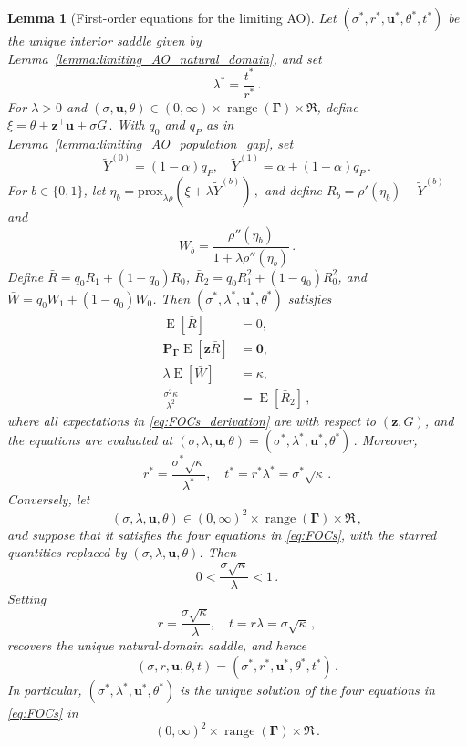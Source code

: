 \documentclass{article}
\DeclareMathOperator{\expect}{E}
\newtheorem{lemma}{Lemma}
\theoremstyle{definition}
\newcommand*{\bb}{\boldsymbol}
\newcommand{\prox}[2]{\ensuremath{\textrm{prox}_{#1}\left(#2\right)}}
\def\bu{\bb{u}}
\def\Ytil{\widetilde{Y}}
\def\bz{\bb{z}}
\newcommand{\range}{\operatorname{range}}
\begin{document}
\begin{bibunit}
\begin{lemma}[First-order equations for the limiting AO]
	\label{lemma:limiting_AO_focs}
	Let $(\sigma^*,r^*,\bu^*,\theta^*,t^*)$
	be the unique interior saddle given by
	Lemma~\ref{lemma:limiting_AO_natural_domain}, and set
	$$
		\lambda^*=\frac{t^*}{r^*}\,.
	$$
	For $\lambda>0$ and
	$(\sigma,\bu,\theta)\in(0,\infty)\times\range(\bb\Gamma)\times\Re$,
	define $\xi=\theta+\bz^\top\bu+\sigma G\,.$ With $q_0$ and $q_P$ as in
	Lemma~\ref{lemma:limiting_AO_population_gap}, set
	$$
		\Ytil^{(0)}=(1-\alpha)q_P,
		\quad
		\Ytil^{(1)}=\alpha+(1-\alpha)q_P\,.
	$$
	For $b\in\{0,1\}$, let $\eta_b = \prox{\lambda\rho}{\xi+\lambda \Ytil^{(b)}}\,,$
	and define $R_b=\rho'(\eta_b)-\Ytil^{(b)}$
	and
	$$
		W_b
		=
		\frac{\rho''(\eta_b)}
		{1+\lambda\rho''(\eta_b)}\,.
	$$
	Define
	$
		\bar R
		=
		q_0R_1+(1-q_0)R_0$, $
		\bar R_2
		=
		q_0R_1^2+(1-q_0)R_0^2$, and $
		\bar W
		=
		q_0W_1+(1-q_0)W_0
	$. 
	Then $(\sigma^*,\lambda^*,\bu^*,\theta^*)$ satisfies
	\begin{equation}
		\label{eq:FOCs_derivation}
		\begin{aligned}
			\expect[\bar R] &= 0,\\
			\bb P_{\bb \Gamma}
			\expect[\bz\bar R] &= \bb0,\\
			\lambda\expect[\bar W] &= \kappa,\\
			\frac{\sigma^2\kappa}{\lambda^2}
			&=
			\expect[\bar R_2]\,,
		\end{aligned}
	\end{equation}
	where all expectations in \eqref{eq:FOCs_derivation} are with respect to $(\bz,G)$, and the equations are evaluated at $(\sigma,\lambda,\bu,\theta) = (\sigma^*,\lambda^*,\bu^*,\theta^*)\,.$
	Moreover,
	$$
		r^*=\frac{\sigma^*\sqrt\kappa}{\lambda^*}, \quad 
		t^*=r^*\lambda^*=\sigma^*\sqrt\kappa\,.
	$$
Conversely, let
$$
    (\sigma,\lambda,\bu,\theta)
    \in
    (0,\infty)^2
    \times
    \range(\bb\Gamma)
    \times
    \Re\,,
$$
and suppose that it satisfies the four equations in \eqref{eq:FOCs}, with
the starred quantities replaced by $(\sigma,\lambda,\bu,\theta)$. Then
$$
    0
    <
    \frac{\sigma\sqrt\kappa}{\lambda}
    <
    1 \,.
$$
Setting
$$
    r
    =
    \frac{\sigma\sqrt\kappa}{\lambda},
    \quad
    t
    =
    r\lambda
    =
    \sigma\sqrt\kappa\,,
$$
recovers the unique natural-domain saddle, and hence
$$
    (\sigma,r,\bu,\theta,t)
    =
    (\sigma^*,r^*,\bu^*,\theta^*,t^*) \,.
$$
In particular,
$(\sigma^*,\lambda^*,\bu^*,\theta^*)$ is the unique solution of the four
equations in \eqref{eq:FOCs} in
$$
    (0,\infty)^2
    \times
    \range(\bb\Gamma)
    \times
    \Re \,.
$$
\end{lemma}


\end{bibunit}
\end{document}
